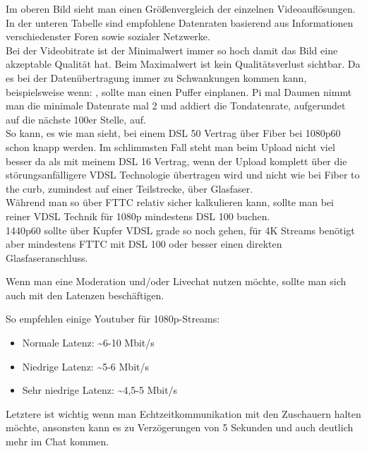 Im oberen Bild sieht man einen Größenvergleich der einzelnen Videoauflösungen. In der unteren Tabelle sind empfohlene Datenraten basierend aus Informationen verschiedenster Foren sowie sozialer Netzwerke. \\

Bei der Videobitrate ist der Minimalwert immer so hoch damit das Bild eine akzeptable Qualität hat. Beim Maximalwert ist kein Qualitätsverlust sichtbar.
Da es bei der Datenübertragung immer zu Schwankungen kommen kann, beispielsweise wenn:  , sollte man einen Puffer einplanen. Pi mal Daumen nimmt man die minimale Datenrate mal 2 und addiert die Tondatenrate, aufgerundet auf die nächste 100er Stelle, auf. \\

\newpage
So kann, es wie man sieht, bei einem DSL 50 Vertrag über Fiber bei 1080p60 \\
schon knapp werden. Im schlimmsten Fall steht man beim Upload nicht viel besser da als mit meinem DSL 16 Vertrag, wenn der Upload komplett über die störungsanfälligere VDSL Technologie übertragen wird und nicht wie bei Fiber to the curb, zumindest auf einer Teilstrecke, über Glasfaser. \\

Während man so über FTTC relativ sicher kalkulieren kann, sollte man bei reiner VDSL Technik für 1080p mindestens DSL 100 buchen.\\

1440p60 sollte über Kupfer VDSL grade so noch gehen, für 4K Streams benötigt aber mindestens FTTC mit DSL 100 oder besser einen direkten Glasfaseranschluss.



Wenn man eine Moderation und/oder Livechat nutzen möchte, sollte man sich auch mit den Latenzen beschäftigen.

So empfehlen einige Youtuber für 1080p-Streams:
\begin{itemize}
  \item Normale Latenz: \textasciitilde 6-10 Mbit/s
  \item Niedrige Latenz: \textasciitilde 5-6 Mbit/s
  \item Sehr niedrige Latenz: \textasciitilde 4,5-5 Mbit/s
\end{itemize}

Letztere ist wichtig wenn man Echtzeitkommunikation mit den Zuschauern halten möchte, ansonsten kann es zu Verzögerungen von 5 Sekunden und auch deutlich mehr im Chat kommen.

